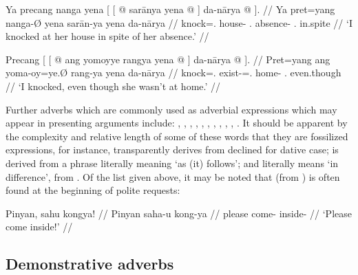 \pex\label{ex:danaarya}
\a\label{ex:danaarya1}\begingl
	\gla Ya precang nanga yena {\normalfont[ [} @ sarānya 
		yena @ {\normalfont]} da-nārya @ {\normalfont]}. //
	\glb Ya pret=yang nanga-Ø yena {} sarān-ya yena {} da-nārya {} //
	\glc \LocT{} knock=\Fsg{}.\Aarg{} house-\Top{} \TsgF{}.\Gen{} {}
		absence-\Loc{} \TsgF{}.\Gen{} {} in.spite {} //
	\glft `I knocked at her house in spite of her absence.' //
\endgl

\a\label{ex:danaarya2}\begingl
	\gla Precang {\normalfont[ [} @ ang yomoyye rangya 
		yena @ {\normalfont]} da-nārya @ {\normalfont]}. //
	\glb Pret=yang {} ang yoma-oy=ye.Ø rang-ya yena {} da-nārya {} //
	\glc knock=\Fsg{}.\Aarg{} {} \AgtT{} exist-\Neg{}=\TsgF{}.\Top{} 
		home-\Loc{} \TsgF{}.\Gen{} {} even.though {} //
	\glft `I knocked, even though she wasn't at home.' //
\endgl

\xe

Further adverbs which are commonly used as adverbial expressions which may 
appear in presenting arguments include:
,
,
,
,
,
,
,
,
,
,
.
It should be apparent by the complexity and relative length of some of these 
words that they are fossilized expressions, for instance, 
 transparently derives from 
 declined for dative case; 
 is derived from a phrase literally meaning `as 
(it) follows'; and  literally 
means `in difference', from . Of the list given above, it may be noted that 
 (from ) is often found 
at the beginning of polite requests:

\ex
\begingl
	\gla Pinyan, sahu kongya! //
	\glb Pinyan saha-u kong-ya //
	\glc please come-\Imp{} inside-\Loc{} //
	\glft `Please come inside!' //
\endgl
\xe


\subsection{Demonstrative adverbs}

